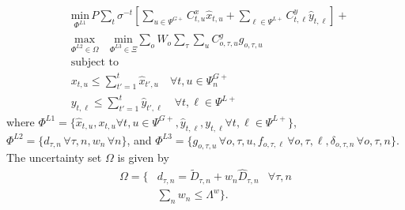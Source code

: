 \documentclass[final]{IEEEtran}
\begin{document}
\begin{align}
&\label{saro_obj} \underset{\Phi^{L1}}{\text{min}} \, P \sum\limits_{t} \sigma^{-t} \left[ \sum\limits_{u \in \Psi^{G+}} C^x_{t, u} \hat{x}_{t, u} + \sum\limits_{\ell \in \Psi^{L+}} C^y_{t, \ell} \hat{y}_{t, \ell} \right] +  \\
&\underset{\Phi^{L2} \in \Omega}{\text{max}} \quad \underset{\Phi^{L3} \in \Xi}{\text{min}} \sum\limits_o W_o \sum\limits_{\tau} \sum\limits_{u} C^g_{o, \tau, u} g_{o, \tau, u} \\
&\text{subject to} \nonumber \\
&\label{master_constraint_first} x_{t, u} \leq \sum\limits_{t' = 1}^{t} \hat{x}_{t', u} 	\quad \forall t, u \in \Psi_n^{G+} \\
&\label{master_constraint_last} y_{t, \ell} \leq \sum\limits_{t' = 1}^{t} \hat{y}_{t', \ell} 	\quad \forall t, \ell \in \Psi^{L+}
\end{align}
where $\Phi^{L1} = \{ \hat{x}_{t, u}, x_{t, u} \forall t, u \in \Psi^{G+}, \hat{y}_{t, \ell}, y_{t, \ell} \forall t, \ell \in \Psi^{L+} \}$, $\Phi^{L2} = \{ d_{\tau, n} \, \forall \tau, n, w_{n} \, \forall n \}$, and $\Phi^{L3} = \{ g_{o, \tau, u} \, \forall o, \tau, u, f_{o, \tau, \ell} \, \forall o, \tau, \ell, \delta_{o, \tau, n} \, \forall o, \tau, n \}$. The uncertainty set $\Omega$ is given by
\begin{align}
\Omega = \{ &d_{\tau, n} = \tilde{D}_{\tau, n} + w_n \hat{D}_{\tau, n} & \forall \tau, n \nonumber \\
&\label{uncertainty_set}\sum\limits_n w_{n} \leq \Lambda^w \}.
\end{align}
\end{document}
